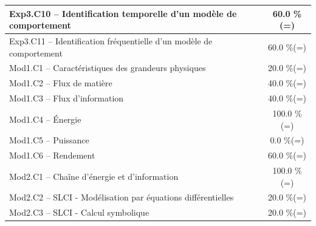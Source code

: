 \begin{center}
\begin{tabular}{|p{.7\linewidth}|c|}
Exp3.C10 -- Identification temporelle d’un modèle de comportement&60.0 \%(=)\\ \hline 
Exp3.C11 -- Identification fréquentielle d’un modèle de comportement&60.0 \%(=)\\ \hline 
Mod1.C1 -- Caractéristiques des grandeurs physiques&20.0 \%(=)\\ \hline 
Mod1.C2 -- Flux de matière&40.0 \%(=)\\ \hline 
Mod1.C3 -- Flux d’information&40.0 \%(=)\\ \hline 
Mod1.C4 -- Énergie&100.0 \%(=)\\ \hline 
Mod1.C5 -- Puissance&0.0 \%(=)\\ \hline 
Mod1.C6 -- Rendement&60.0 \%(=)\\ \hline 
Mod2.C1 -- Chaîne d’énergie et d'information&100.0 \%(=)\\ \hline 
Mod2.C2 -- SLCI - Modélisation par équations différentielles&20.0 \%(=)\\ \hline 
Mod2.C3 -- SLCI - Calcul symbolique&20.0 \%(=)\\ \hline 
\end{tabular} 
\end{center} 
\normalsize 
 
